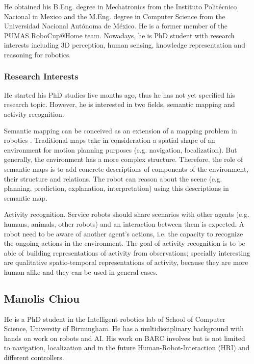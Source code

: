 \documentclass[conference]{IEEEtran}
\begin{document}
He obtained his B.Eng. degree in Mechatronics from the Instituto Politécnico Nacional in Mexico and the M.Eng. degree in Computer Science from the Universidad Nacional Autónoma de México. He is a former member of the PUMAS RoboCup@Home team. Nowadays, he is PhD student with research interests including 3D perception, human sensing, knowledge representation and reasoning for robotics.

\subsubsection*{Research Interests}

He started his PhD studies five months ago, thus he has not yet specified his research topic. However, he is interested in two fields, semantic mapping and activity recognition.

Semantic mapping can be conceived as an extension of a mapping problem in robotics \cite{Nuchter08_TowardsSemanticMaps}. Traditional maps take in consideration a spatial shape of an environment for motion planning purposes (e.g. navigation, localization). But generally, the environment has a more complex structure. Therefore, the role of semantic maps is to add concrete descriptions of components of the environment, their structure and relations. The robot can reason about the scene (e.g. planning, prediction, explanation, interpretation) using this descriptions in semantic map.

Activity recognition. Service robots should share scenarios with other agents (e.g. humans, animals, other robots) and an interaction between them is expected. A robot need to be aware of another agent's actions, i.e. the capacity to recognize the ongoing actions in the environment. The goal of activity recognition is to be able of building representations of activity from observations; specially interesting are qualitative spatio-temporal representations of activity, because they are more human alike and they can be used in general cases.

\subsection{Manolis Chiou}

He is a PhD student in the Intelligent robotics lab of School of Computer Science, University of Birmingham. He has a multidisciplinary background with hands on work on robots and AI. His work on BARC involves but is not limited to navigation, localization and in the future Human-Robot-Interaction (HRI) and different controllers.
\end{document}
